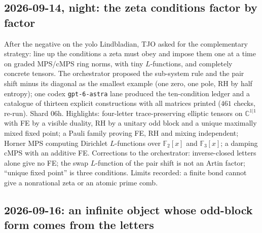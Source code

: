 \subsection*{2026-09-14, night: the zeta conditions factor by factor}

After the negative on the yolo Lindbladian, TJO asked for the complementary strategy: line up the
conditions a zeta must obey and impose them one at a time on graded MPS/cMPS ring norms, with tiny
$L$-functions, and completely concrete tensors. The orchestrator proposed the sub-system rule and the
pair shift minus its diagonal as the smallest example (one zero, one pole, RH by half entropy); one
codex \texttt{gpt-6-astra} lane produced the ten-condition ledger and a catalogue of thirteen
explicit constructions with all matrices printed ($461$ checks, re-run). Shard 06h. Highlights: four-letter
trace-preserving elliptic tensors on $\mathbb C^{1|1}$ with FE by a visible duality, RH by a unitary odd block
and a unique maximally mixed fixed point; a Pauli family proving FE, RH and mixing independent;
Horner MPS computing Dirichlet $L$-functions over $\mathbb F_2[x]$ and $\mathbb F_3[x]$; a damping cMPS with an
additive FE. Corrections to the orchestrator: inverse-closed letters alone give no FE; the swap
$L$-function of the pair shift is not an Artin factor; ``unique fixed point'' is three conditions.
Limits recorded: a finite bond cannot give a nonrational zeta or an atomic prime comb.

\subsection*{2026-09-16: an infinite object whose odd-block form comes from the letters}


